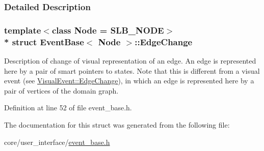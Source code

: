 \subsubsection{Detailed Description}
\subsubsection*{template$<$class Node = S\+L\+B\+\_\+\+N\+O\+DE$>$\\*
struct Event\+Base$<$ Node $>$\+::\+Edge\+Change}

Description of change of visual representation of an edge. An edge is represented here by a pair of smart pointers to states. Note that this is different from a visual event (see \hyperlink{structVisualEvent_1_1EdgeChange}{Visual\+Event\+::\+Edge\+Change}), in which an edge is represented here by a pair of vertices of the domain graph. 

Definition at line 52 of file event\+\_\+base.\+h.



The documentation for this struct was generated from the following file\+:\begin{DoxyCompactItemize}
\item 
core/user\+\_\+interface/\hyperlink{event__base_8h}{event\+\_\+base.\+h}\end{DoxyCompactItemize}
